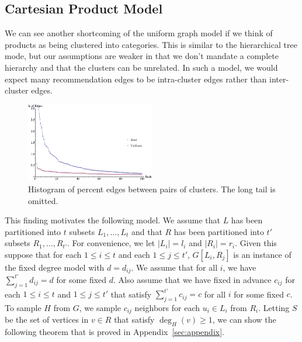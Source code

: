 \subsection{Cartesian Product Model}
\label{cartesian}
We can see another shortcoming of the uniform graph model if we think
of products as being clustered into categories. This is similar to the
hierarchical tree mode, but our assumptions are weaker in that we don't
mandate a complete hierarchy and that the clusters can be unrelated. In
such a model, we would expect many recommendation edges to be
intra-cluster edges rather than inter-cluster edges. 

\begin{figure}[h]
\centering
\includegraphics[width=0.5\textwidth]{images/cartesian_histogram.png}
\begin{minipage}[h]{1\textwidth}
\caption{Histogram of percent edges between pairs of clusters. The long tail is omitted.}
\end{minipage}
\end{figure}

This finding motivates the following model. We assume that
$L$ has been partitioned into $t$ subsets $L_1,\ldots, L_t$ and
that $R$ has been partitioned into $t'$ subsets $R_1,\ldots,
R_{t'}$. For convenience, we let $|L_i| = l_i$ and $|R_i|=r_i$. Given
this suppose that for each $1\leq i\leq t$ and each $1\leq j\leq t'$,
$G[L_i, R_j]$ is an instance of the fixed degree model with
$d=d_{ij}$. We assume that for all $i$, we have $\sum_{j=1}^{t'}
d_{ij} = d$ for some fixed $d$. Also assume that we have fixed in
advance $c_{ij}$ for each $1\leq i\leq t$ and $1\leq j\leq t'$ that
satisfy $\sum_{j=1}^{t'} c_{ij} = c$ for all $i$ for some fixed $c$.
To sample $H$ from $G$, we sample $c_{ij}$ neighbors for each
$u_i\in L_i$ from $R_i$. Letting $S$ be the set of vertices in
$v\in R$ that satisfy $\deg_H(v)\geq 1$, we can show the following theorem
that is proved in Appendix~\ref{sec:appendix}.

